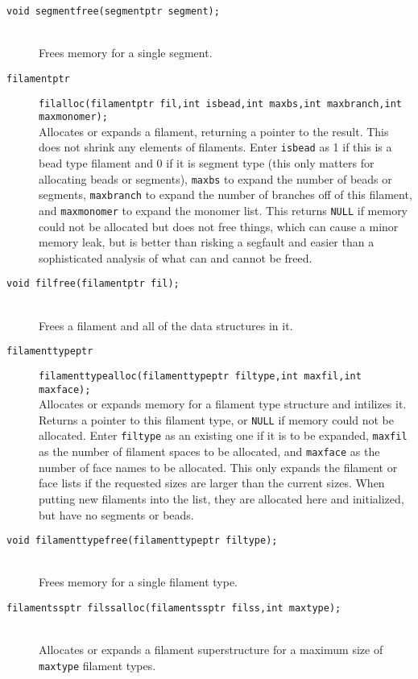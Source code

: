 \documentclass {scrbook}
\newcommand {\ttt} {\texttt}
\begin{document}
\begin{description}
\item[\ttt{void segmentfree(segmentptr segment);}]
\hfill \\
Frees memory for a single segment.

\item[\ttt{filamentptr}]
\ttt{filalloc(filamentptr fil,int isbead,int maxbs,int maxbranch,int maxmonomer);}
\hfill \\
Allocates or expands a filament, returning a pointer to the result. This does not shrink any elements of filaments. Enter \ttt{isbead} as 1 if this is a bead type filament and 0 if it is segment type (this only matters for allocating beads or segments), \ttt{maxbs} to expand the number of beads or segments, \ttt{maxbranch} to expand the number of branches off of this filament, and \ttt{maxmonomer} to expand the monomer list. This returns \ttt{NULL} if memory could not be allocated but does not free things, which can cause a minor memory leak, but is better than risking a segfault and easier than a sophisticated analysis of what can and cannot be freed.

\item[\ttt{void filfree(filamentptr fil);}]
\hfill \\
Frees a filament and all of the data structures in it.

\item[\ttt{filamenttypeptr}]
\ttt{filamenttypealloc(filamenttypeptr filtype,int maxfil,int maxface);}
\hfill \\
Allocates or expands memory for a filament type structure and intilizes it. Returns a pointer to this filament type, or \ttt{NULL} if memory could not be allocated. Enter \ttt{filtype} as an existing one if it is to be expanded, \ttt{maxfil} as the number of filament spaces to be allocated, and \ttt{maxface} as the number of face names to be allocated. This only expands the filament or face lists if the requested sizes are larger than the current sizes. When putting new filaments into the list, they are allocated here and initialized, but have no segments or beads.

\item[\ttt{void filamenttypefree(filamenttypeptr filtype);}]
\hfill \\
Frees memory for a single filament type.

\item[\ttt{filamentssptr filssalloc(filamentssptr filss,int maxtype);}]
\hfill \\
Allocates or expands a filament superstructure for a maximum size of \ttt{maxtype} filament types.


\end{description}
\end{document}

